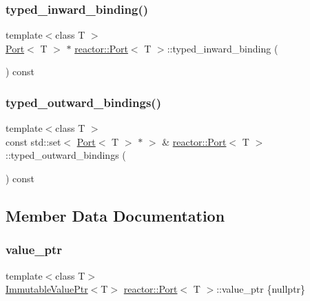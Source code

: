 \subsubsection{\texorpdfstring{typed\+\_\+inward\+\_\+binding()}{typed\_inward\_binding()}}
{\footnotesize\ttfamily template$<$class T $>$ \\
\hyperlink{classreactor_1_1Port}{Port}$<$ T $>$ $\ast$ \hyperlink{classreactor_1_1Port}{reactor\+::\+Port}$<$ T $>$\+::typed\+\_\+inward\+\_\+binding (\begin{DoxyParamCaption}{ }\end{DoxyParamCaption}) const}

\mbox{\label{classreactor_1_1Port_a4d3f681f3f3e0ef75988c3790eb24a17}} 
\subsubsection{\texorpdfstring{typed\+\_\+outward\+\_\+bindings()}{typed\_outward\_bindings()}}
{\footnotesize\ttfamily template$<$class T $>$ \\
const std\+::set$<$ \hyperlink{classreactor_1_1Port}{Port}$<$ T $>$ $\ast$ $>$ \& \hyperlink{classreactor_1_1Port}{reactor\+::\+Port}$<$ T $>$\+::typed\+\_\+outward\+\_\+bindings (\begin{DoxyParamCaption}{ }\end{DoxyParamCaption}) const}



\subsection{Member Data Documentation}
\mbox{\label{classreactor_1_1Port_adb40730eea54b529168a70cf8ed933c7}} 
\subsubsection{\texorpdfstring{value\+\_\+ptr}{value\_ptr}}
{\footnotesize\ttfamily template$<$class T$>$ \\
\hyperlink{classreactor_1_1ImmutableValuePtr}{Immutable\+Value\+Ptr}$<$T$>$ \hyperlink{classreactor_1_1Port}{reactor\+::\+Port}$<$ T $>$\+::value\+\_\+ptr \{nullptr\}\hspace{0.3cm}{\ttfamily [private]}}



